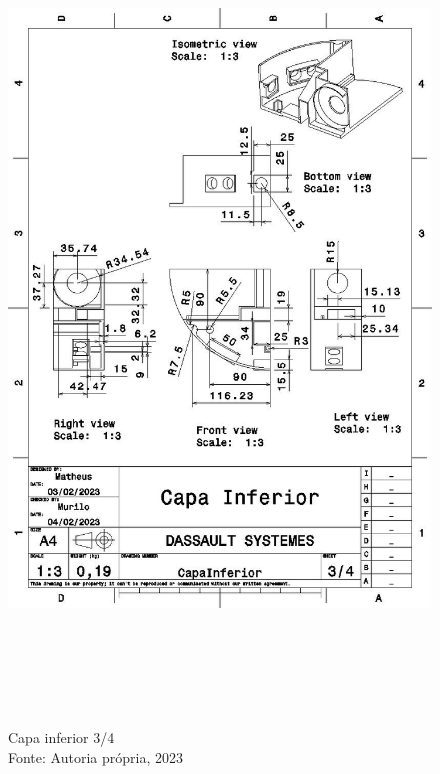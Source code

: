 \newpage
\pagebreak
\begin{figure}[h!]
\centering
\includegraphics[width=16cm,height=22cm]{figuras/CapaInferior3_4.jpg}
\caption{Capa inferior 3/4\\Fonte: Autoria própria, 2023}
\label{CapaInferior3_4}
\end{figure}

